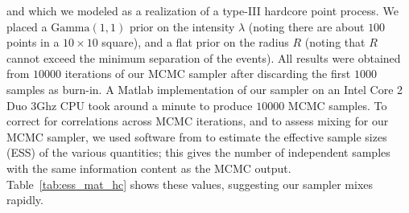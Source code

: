 \documentclass{statsoc}
\begin{document}
and which we modeled as a realization of a \matern type-III hardcore point process. 
We placed a $\text{Gamma}(1,1)$ prior on the intensity $\lambda$ (noting there are about $100$ points in a $10\times10$ square), and a flat prior on 
the radius $R$ (noting that $R$ cannot exceed the minimum separation of the \matern events). 
All results were obtained from $10000$ iterations of our MCMC sampler after discarding the first
$1000$ samples as burn-in. 
A Matlab implementation of our sampler 
on an Intel Core 2 Duo $3$Ghz CPU took around a minute to produce $10000$ MCMC samples.
To correct for correlations across MCMC iterations, and to assess mixing for our MCMC sampler, we used software from \cite{Rcoda2006} to
estimate the effective sample sizes (ESS) of the various quantities; this gives the number of independent samples with the same information content as
the MCMC output.
Table~\ref{tab:ess_mat_hc} shows these values, suggesting our sampler mixes rapidly.
\end{document}
